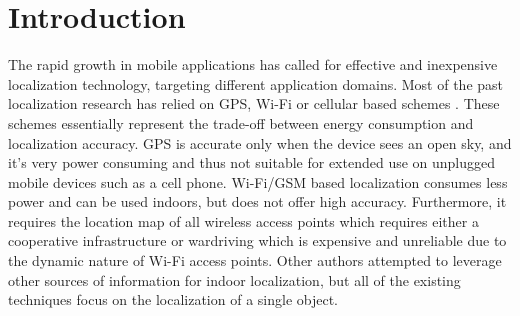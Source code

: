 \section{Introduction}
The rapid growth in mobile applications has called for effective and
inexpensive localization technology, targeting different application domains. 
Most of the past localization research has relied on
GPS, Wi-Fi or cellular based schemes 
\cite{constandache2010did,mobisys:EnTracked,zhuang2010improving}. 
These schemes essentially represent the trade-off between 
energy consumption and localization accuracy. 
GPS is accurate only when the device sees an open sky, and it's very
power consuming and thus not suitable for extended use on unplugged mobile
devices such as a cell phone. Wi-Fi/GSM based localization consumes less power
and can be used indoors, but does not offer high accuracy. 
Furthermore, it requires the location map 
of all wireless access points which requires either a cooperative 
infrastructure or wardriving which is expensive and unreliable due 
to the dynamic nature of Wi-Fi access points. Other authors attempted to
leverage other sources of information \cite{ravi2007fiatlux,ravi2006indoor}
for indoor localization, but all of the existing techniques focus on
the localization of a single object.



